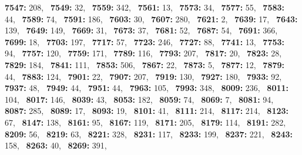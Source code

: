 \textbf{7547:} 208,\allowbreak~ 
\textbf{7549:} 32,\allowbreak~ 
\textbf{7559:} 342,\allowbreak~ 
\textbf{7561:} 13,\allowbreak~ 
\textbf{7573:} 34,\allowbreak~ 
\textbf{7577:} 55,\allowbreak~ 
\textbf{7583:} 44,\allowbreak~ 
\textbf{7589:} 74,\allowbreak~ 
\textbf{7591:} 186,\allowbreak~ 
\textbf{7603:} 30,\allowbreak~ 
\textbf{7607:} 280,\allowbreak~ 
\textbf{7621:} 2,\allowbreak~ 
\textbf{7639:} 17,\allowbreak~ 
\textbf{7643:} 139,\allowbreak~ 
\textbf{7649:} 149,\allowbreak~ 
\textbf{7669:} 31,\allowbreak~ 
\textbf{7673:} 37,\allowbreak~ 
\textbf{7681:} 52,\allowbreak~ 
\textbf{7687:} 54,\allowbreak~ 
\textbf{7691:} 366,\allowbreak~ 
\textbf{7699:} 18,\allowbreak~ 
\textbf{7703:} 197,\allowbreak~ 
\textbf{7717:} 57,\allowbreak~ 
\textbf{7723:} 246,\allowbreak~ 
\textbf{7727:} 88,\allowbreak~ 
\textbf{7741:} 13,\allowbreak~ 
\textbf{7753:} 94,\allowbreak~ 
\textbf{7757:} 120,\allowbreak~ 
\textbf{7759:} 171,\allowbreak~ 
\textbf{7789:} 116,\allowbreak~ 
\textbf{7793:} 207,\allowbreak~ 
\textbf{7817:} 20,\allowbreak~ 
\textbf{7823:} 28,\allowbreak~ 
\textbf{7829:} 184,\allowbreak~ 
\textbf{7841:} 111,\allowbreak~ 
\textbf{7853:} 506,\allowbreak~ 
\textbf{7867:} 22,\allowbreak~ 
\textbf{7873:} 5,\allowbreak~ 
\textbf{7877:} 12,\allowbreak~ 
\textbf{7879:} 44,\allowbreak~ 
\textbf{7883:} 124,\allowbreak~ 
\textbf{7901:} 22,\allowbreak~ 
\textbf{7907:} 207,\allowbreak~ 
\textbf{7919:} 130,\allowbreak~ 
\textbf{7927:} 180,\allowbreak~ 
\textbf{7933:} 92,\allowbreak~ 
\textbf{7937:} 48,\allowbreak~ 
\textbf{7949:} 44,\allowbreak~ 
\textbf{7951:} 44,\allowbreak~ 
\textbf{7963:} 105,\allowbreak~ 
\textbf{7993:} 348,\allowbreak~ 
\textbf{8009:} 236,\allowbreak~ 
\textbf{8011:} 104,\allowbreak~ 
\textbf{8017:} 146,\allowbreak~ 
\textbf{8039:} 43,\allowbreak~ 
\textbf{8053:} 182,\allowbreak~ 
\textbf{8059:} 74,\allowbreak~ 
\textbf{8069:} 7,\allowbreak~ 
\textbf{8081:} 94,\allowbreak~ 
\textbf{8087:} 285,\allowbreak~ 
\textbf{8089:} 17,\allowbreak~ 
\textbf{8093:} 19,\allowbreak~ 
\textbf{8101:} 41,\allowbreak~ 
\textbf{8111:} 214,\allowbreak~ 
\textbf{8117:} 214,\allowbreak~ 
\textbf{8123:} 67,\allowbreak~ 
\textbf{8147:} 138,\allowbreak~ 
\textbf{8161:} 95,\allowbreak~ 
\textbf{8167:} 119,\allowbreak~ 
\textbf{8171:} 205,\allowbreak~ 
\textbf{8179:} 114,\allowbreak~ 
\textbf{8191:} 282,\allowbreak~ 
\textbf{8209:} 56,\allowbreak~ 
\textbf{8219:} 63,\allowbreak~ 
\textbf{8221:} 328,\allowbreak~ 
\textbf{8231:} 117,\allowbreak~ 
\textbf{8233:} 199,\allowbreak~ 
\textbf{8237:} 221,\allowbreak~ 
\textbf{8243:} 158,\allowbreak~ 
\textbf{8263:} 40,\allowbreak~ 
\textbf{8269:} 391,\allowbreak~ 
